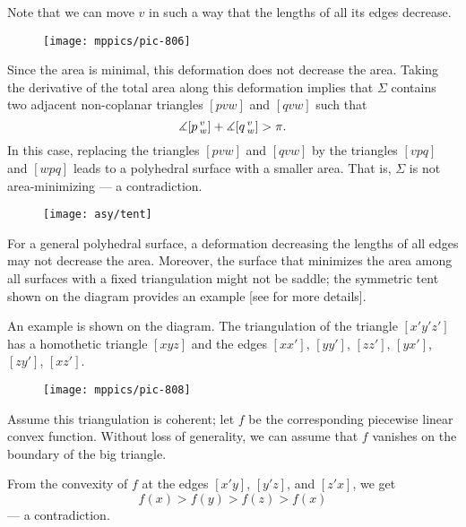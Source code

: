 Note that we can move $v$ in such a way that the lengths of all its edges decrease.

\begin{wrapfigure}{r}{43 mm}
\vskip0mm
\centering
\texttt{[image: mppics/pic-806]}
\end{wrapfigure}

Since the area is minimal,  this deformation does not decrease the area. 
Taking the derivative of the total area along this deformation implies that $\Sigma$
contains two adjacent non-coplanar triangles $[pvw]$ and $[qvw]$ such that
\[\measuredangle [p\,{}^{v}_{w}]+\measuredangle [q\,{}^{v}_{w}]> \pi.\]
In this case, replacing the triangles $[pvw]$ and $[qvw]$
by the triangles $[vpq]$ and $[wpq]$
leads to a polyhedral surface with a smaller area.
That is, $\Sigma$ is not area-minimizing --- a contradiction.
\qeds

{

\begin{wrapfigure}{r}{43 mm}
\vskip-8mm
\centering
\texttt{[image: asy/tent]}
\end{wrapfigure}

For a general polyhedral surface, a deformation decreasing the lengths of all edges may not decrease the area.
Moreover, the surface that minimizes the area among all surfaces with a fixed  triangulation might not be saddle;
the symmetric tent shown on the diagram provides an example [see  for more details].


An example is shown on the diagram.
The triangulation of the triangle $[x'y'z']$ has a homothetic triangle $[xyz]$ and the edges
$[xx']$, $[yy']$, $[zz']$, 
$[yx']$, $[zy']$, $[xz']$.

}

\medskip

\begin{wrapfigure}{r}{33 mm}
\vskip0mm
\centering
\texttt{[image: mppics/pic-808]}
\end{wrapfigure}

Assume this triangulation is coherent;
let $f$ be the corresponding piecewise linear convex function.
Without loss of generality, we can assume that $f$ vanishes on the boundary of the big triangle.

From the convexity of $f$ at the edges $[x'y]$,  $[y'z]$, and $[z'x]$, we get 
\[f(x)>f(y)>f(z)>f(x)\]
--- a contradiction.
\qeds

